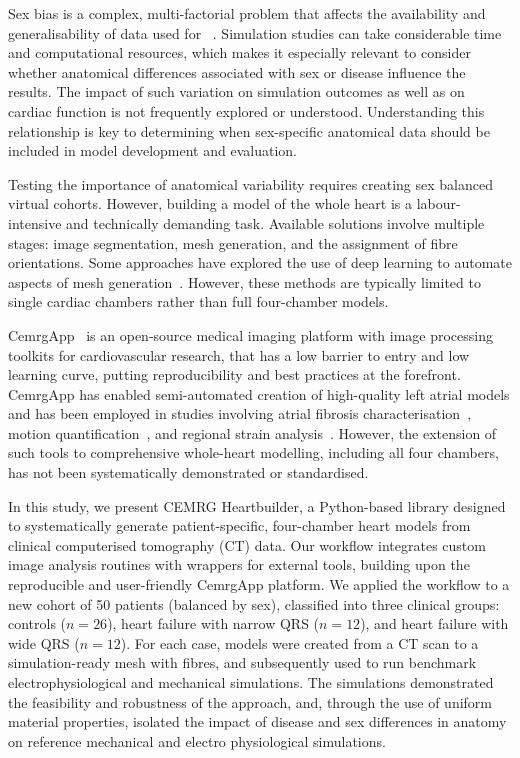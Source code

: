 Sex bias is a complex, multi-factorial problem that affects the availability and generalisability 
of data used for \CMnS~\cite{steuernagel2023_sex_bias}.
Simulation studies can take considerable time and computational resources, 
which makes it especially relevant to consider whether anatomical differences associated with sex 
or disease influence the results.
The impact of such variation on simulation outcomes as well as on cardiac function is not frequently explored
or understood.
Understanding this relationship is key to determining when sex-specific anatomical data should be 
included in model development and evaluation.

Testing the importance of anatomical variability requires creating sex balanced virtual cohorts. 
However, building a model of the whole heart is a labour-intensive and technically demanding task.
Available solutions involve multiple stages: 
image segmentation, mesh generation, and the assignment of fibre orientations. 
Some approaches have explored the use of deep learning to automate aspects of 
mesh generation~\cite{pak2024_ai_meshes}. 
However, these methods are typically limited to single cardiac chambers rather than 
full four-chamber models.

CemrgApp~\cite{Razeghi2020-cemrgapp} is an open-source medical imaging platform with 
image processing toolkits for cardiovascular research, that has a low barrier to entry 
and low learning curve, putting reproducibility and best practices at the forefront.
CemrgApp has enabled semi-automated creation of high-quality left atrial models and 
has been employed in studies involving 
atrial fibrosis characterisation~\cite{Sim2019-reproducibility}, 
motion quantification~\cite{sillett2024_motion}, and 
regional strain analysis~\cite{sillett2023_strain1}. 
However, the extension of such tools to comprehensive whole-heart modelling, including 
all four chambers, has not been systematically demonstrated or standardised.

In this study, we present CEMRG Heartbuilder, 
a Python-based library designed to systematically generate patient-specific, 
four-chamber heart models from clinical computerised tomography (CT) data. 
Our workflow integrates custom image analysis routines with 
wrappers for external tools, building upon the reproducible and user-friendly CemrgApp platform. 
We applied the workflow to a new cohort of 50 patients (balanced by sex), 
classified into three clinical groups: controls ($n=26$), heart failure with narrow QRS ($n=12$), 
and heart failure with wide QRS ($n=12$). For each case, models were created from a CT scan 
to a simulation-ready mesh with fibres, and subsequently used to run benchmark electrophysiological and 
mechanical simulations. 
The simulations demonstrated the feasibility and robustness of the approach,
and, through the use of uniform material properties, isolated the impact of disease and sex differences 
in anatomy on reference mechanical and electro physiological simulations.

